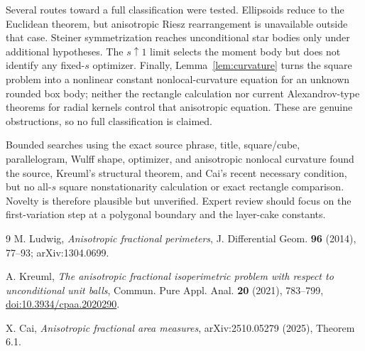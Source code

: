 \documentclass[11pt]{article}
\begin{document}
Several routes toward a full classification were tested.  Ellipsoids reduce
to the Euclidean theorem, but anisotropic Riesz rearrangement is unavailable
outside that case.  Steiner symmetrization reaches unconditional star bodies
only under additional hypotheses.  The $s\uparrow1$ limit selects the moment
body but does not identify any fixed-$s$ optimizer.  Finally,
Lemma~\ref{lem:curvature} turns the square problem into a nonlinear constant
nonlocal-curvature equation for an unknown rounded box body; neither the
rectangle calculation nor current Alexandrov-type theorems for radial kernels
control that anisotropic equation.  These are genuine obstructions, so no full
classification is claimed.

Bounded searches using the exact source phrase, title, square/cube,
parallelogram, Wulff shape, optimizer, and anisotropic nonlocal curvature found
the source, Kreuml's structural theorem, and Cai's recent necessary condition,
but no all-$s$ square nonstationarity calculation or exact rectangle comparison.
Novelty is therefore plausible but unverified.  Expert review should focus on
the first-variation step at a polygonal boundary and the layer-cake constants.

\begin{thebibliography}{9}
M. Ludwig,
\emph{Anisotropic fractional perimeters},
J. Differential Geom. \textbf{96} (2014), 77--93;
arXiv:1304.0699.

A. Kreuml,
\emph{The anisotropic fractional isoperimetric problem with respect to
unconditional unit balls},
Commun. Pure Appl. Anal. \textbf{20} (2021), 783--799,
\href{https://doi.org/10.3934/cpaa.2020290}{doi:10.3934/cpaa.2020290}.

X. Cai,
\emph{Anisotropic fractional area measures},
arXiv:2510.05279 (2025), Theorem 6.1.
\end{thebibliography}
\end{document}
